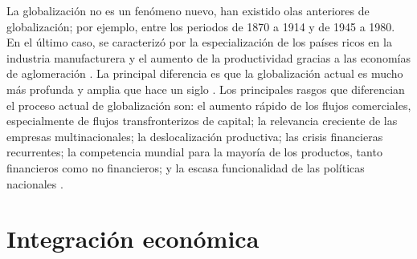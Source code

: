 La globalización no es un fenómeno nuevo, han existido olas anteriores de globalización; por ejemplo, entre los periodos de 1870 a 1914 y de 1945 a 1980. En el último caso, se caracterizó por la especialización de los países ricos en la industria manufacturera y el aumento de la productividad gracias a las economías de aglomeración \parencite[pp.~4--5]{Carbaugh2009}. La principal diferencia es que la globalización actual es mucho más profunda y amplia que hace un siglo \parencite{Bordo1999}. Los principales rasgos que diferencian el proceso actual de globalización son: el aumento rápido de los flujos comerciales, especialmente de flujos transfronterizos de capital; la relevancia creciente de las empresas multinacionales; la deslocalización productiva; las crisis financieras recurrentes; la competencia mundial para la mayoría de los productos, tanto financieros como no financieros; y la escasa funcionalidad de las políticas nacionales \parencite[p.~346]{Requijo2011}.

\section{Integración económica}

